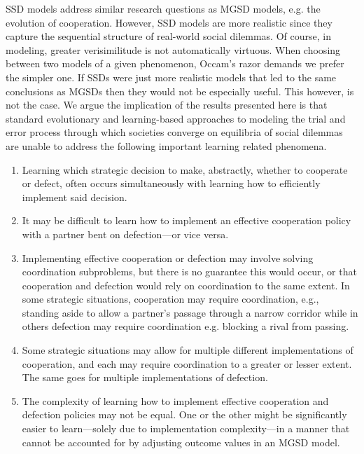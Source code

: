 \documentclass{aamas2017}
\begin{document}
SSD models address similar research questions as MGSD models, e.g. the evolution of cooperation. However, SSD models are more realistic since they capture the sequential structure of real-world social dilemmas. Of course, in modeling, greater verisimilitude is not automatically virtuous. When choosing between two models of a given phenomenon, Occam's razor demands we prefer the simpler one. If SSDs were just more realistic models that led to the same conclusions as MGSDs then they would not be especially useful. This however, is not the case. We argue the implication of the results presented here is that standard evolutionary and learning-based approaches to modeling the trial and error process through which societies converge on equilibria of social dilemmas are unable to address the following important learning related phenomena.
\begin{enumerate}
 \item Learning which strategic decision to make, abstractly, whether to cooperate or defect, often occurs simultaneously with learning how to efficiently implement said decision.
 \item It may be difficult to learn how to implement an effective cooperation policy with a partner bent on defection---or vice versa.
 \item Implementing effective cooperation or defection may involve solving coordination subproblems, but there is no guarantee this would occur, or that cooperation and defection would rely on coordination to the same extent. In some strategic situations, cooperation may require coordination, e.g., standing aside to allow a partner's passage through a narrow corridor while in others defection may require coordination e.g. blocking a rival from passing.
 \item Some strategic situations may allow for multiple different implementations of cooperation, and each may require coordination to a greater or lesser extent. The same goes for multiple implementations of defection.
 \item The complexity of learning how to implement effective cooperation and defection policies may not be equal. One or the other might be significantly easier to learn---solely due to  implementation complexity---in a manner that cannot be accounted for by adjusting outcome values in an MGSD model.
\end{enumerate}
\end{document}
